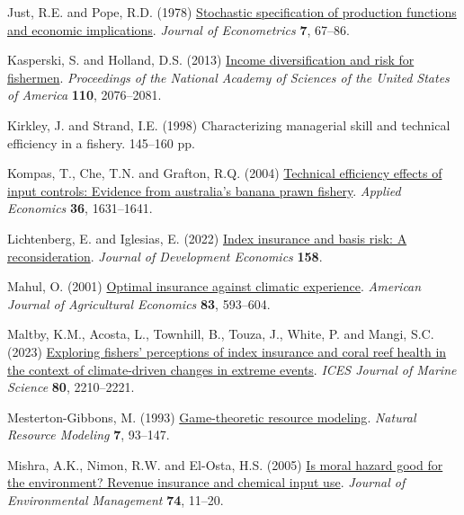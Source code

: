 \documentclass[
  letterpaper,
  DIV=11,
  numbers=noendperiod]{scrartcl}
\newlength{\cslhangindent}
\newenvironment{CSLReferences}[2] %
 {\begin{list}{}{%
  \setlength{\itemindent}{0pt}
  \setlength{\leftmargin}{0pt}
  \setlength{\parsep}{0pt}
  \ifodd #1
   \setlength{\leftmargin}{\cslhangindent}
   \setlength{\itemindent}{-1\cslhangindent}
  \fi
  \setlength{\itemsep}{#2\baselineskip}}}
 {\end{list}}
\theoremstyle{plain}
\theoremstyle{plain}
\theoremstyle{remark}
\begin{document}
\begin{CSLReferences}{1}{0}
Just, R.E. and Pope, R.D. (1978)
\href{https://doi.org/10.1016/0304-4076(78)90006-4}{Stochastic
specification of production functions and economic implications}.
\emph{Journal of Econometrics} \textbf{7}, 67--86.

Kasperski, S. and Holland, D.S. (2013)
\href{https://doi.org/10.1073/pnas.1212278110}{Income diversification
and risk for fishermen}. \emph{Proceedings of the National Academy of
Sciences of the United States of America} \textbf{110}, 2076--2081.

Kirkley, J. and Strand, I.E. (1998) Characterizing managerial skill and
technical efficiency in a fishery. 145--160 pp.

Kompas, T., Che, T.N. and Grafton, R.Q. (2004)
\href{https://doi.org/10.1080/0003684042000218561}{Technical efficiency
effects of input controls: Evidence from australia's banana prawn
fishery}. \emph{Applied Economics} \textbf{36}, 1631--1641.

Lichtenberg, E. and Iglesias, E. (2022)
\href{https://doi.org/10.1016/j.jdeveco.2022.102883}{Index insurance and
basis risk: A reconsideration}. \emph{Journal of Development Economics}
\textbf{158}.

Mahul, O. (2001) \href{https://doi.org/10.1111/0002-9092.00180}{Optimal
insurance against climatic experience}. \emph{American Journal of
Agricultural Economics} \textbf{83}, 593--604.

Maltby, K.M., Acosta, L., Townhill, B., Touza, J., White, P. and Mangi,
S.C. (2023) \href{https://doi.org/10.1093/icesjms/fsac003}{Exploring
fishers' perceptions of index insurance and coral reef health in the
context of climate-driven changes in extreme events}. \emph{ICES Journal
of Marine Science} \textbf{80}, 2210--2221.

Mesterton-Gibbons, M. (1993)
\href{https://doi.org/10.1111/j.1939-7445.1993.tb00143.x}{Game-theoretic
resource modeling}. \emph{Natural Resource Modeling} \textbf{7},
93--147.

Mishra, A.K., Nimon, R.W. and El-Osta, H.S. (2005)
\href{https://doi.org/10.1016/j.jenvman.2004.08.003}{Is moral hazard
good for the environment? Revenue insurance and chemical input use}.
\emph{Journal of Environmental Management} \textbf{74}, 11--20.


\end{CSLReferences}
\end{document}

